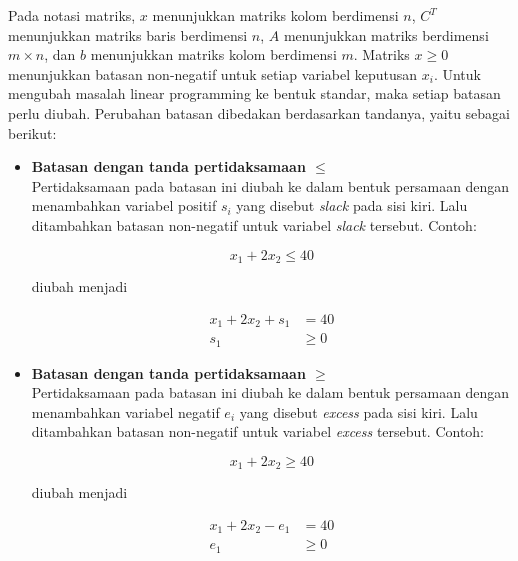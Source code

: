 Pada notasi matriks, $x$ menunjukkan matriks kolom berdimensi $n$, $C^T$ menunjukkan matriks baris berdimensi $n$, $A$ menunjukkan matriks berdimensi $m\times n$, dan $b$ menunjukkan matriks kolom berdimensi $m$. Matriks $x\geq0$ menunjukkan batasan non-negatif untuk setiap variabel keputusan $x_i$. Untuk mengubah masalah linear programming ke bentuk standar, maka setiap batasan perlu diubah. Perubahan batasan dibedakan berdasarkan tandanya, yaitu sebagai berikut:
		
		\begin{itemize}
			\item \textbf{Batasan dengan tanda pertidaksamaan \(\leq\)}\\
				Pertidaksamaan pada batasan ini diubah ke dalam bentuk persamaan dengan menambahkan variabel positif \(s_i\) yang disebut \textit{slack} pada sisi kiri. Lalu ditambahkan batasan non-negatif untuk variabel \textit{slack} tersebut. Contoh:
				
				\begin{equation*}
					x_1 + 2x_2 \leq 40
				\end{equation*}
				
				diubah menjadi
				
				\begin{equation*}
					\begin{split}
						x_1 + 2x_2 + s_1 &= 40\\
						s_1 &\geq 0
					\end{split}
				\end{equation*}
			
			\item \textbf{Batasan dengan tanda pertidaksamaan \(\geq\)}\\			
				Pertidaksamaan pada batasan ini diubah ke dalam bentuk persamaan dengan menambahkan variabel negatif \(e_i\) yang disebut \textit{excess} pada sisi kiri. Lalu ditambahkan batasan non-negatif untuk variabel \textit{excess} tersebut. Contoh:
				
				\begin{equation*}
					x_1 + 2x_2 \geq 40
				\end{equation*}
				
				diubah menjadi
				
				\begin{equation*}
					\begin{split}
						x_1 + 2x_2 - e_1 &= 40\\
						e_1 &\geq 0
					\end{split}
				\end{equation*}				
		\end{itemize}
		

